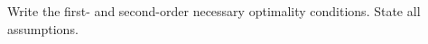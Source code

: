 Write the first- and second-order necessary optimality conditions. State all assumptions.

\begin{solution}
    \ \\
    \vfill
\end{solution}